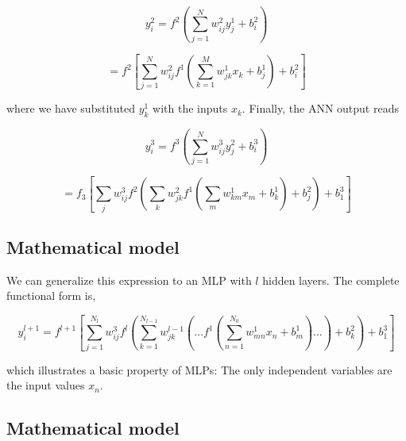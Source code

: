 \documentclass[11pt]{article}
\begin{document}
    \hypertarget{_auto2}{}

\[
\begin{equation}
 y_i^2 = f^2\left(\sum_{j=1}^N w_{ij}^2 y_j^1 + b_i^2\right) 
\label{_auto2} \tag{5}
\end{equation}
\]

    \hypertarget{outputLayer2}{}

\[
\begin{equation} 
 = f^2\left[\sum_{j=1}^N w_{ij}^2f^1\left(\sum_{k=1}^M w_{jk}^1 x_k + b_j^1\right) + b_i^2\right]
\label{outputLayer2} \tag{6}
\end{equation}
\]

    where we have substituted \(y_k^1\) with the inputs \(x_k\). Finally,
the ANN output reads

    \hypertarget{_auto3}{}

\[
\begin{equation}
 y_i^3 = f^3\left(\sum_{j=1}^N w_{ij}^3 y_j^2 + b_i^3\right) 
\label{_auto3} \tag{7}
\end{equation}
\]

    \hypertarget{_auto4}{}

\[
\begin{equation} 
 = f_3\left[\sum_{j} w_{ij}^3 f^2\left(\sum_{k} w_{jk}^2 f^1\left(\sum_{m} w_{km}^1 x_m + b_k^1\right) + b_j^2\right)
  + b_1^3\right]
\label{_auto4} \tag{8}
\end{equation}
\]

    \hypertarget{mathematical-model}{%
\subsection{Mathematical model}\label{mathematical-model}}

We can generalize this expression to an MLP with \(l\) hidden layers.
The complete functional form is,

    \hypertarget{completeNN}{}

\[
\begin{equation}
y^{l+1}_i = f^{l+1}\left[\!\sum_{j=1}^{N_l} w_{ij}^3 f^l\left(\sum_{k=1}^{N_{l-1}}w_{jk}^{l-1}\left(\dots f^1\left(\sum_{n=1}^{N_0} w_{mn}^1 x_n+ b_m^1\right)\dots\right)+b_k^2\right)+b_1^3\right] 
\label{completeNN} \tag{9}
\end{equation}
\]

    which illustrates a basic property of MLPs: The only independent
variables are the input values \(x_n\).

\hypertarget{mathematical-model}{%
\subsection{Mathematical model}\label{mathematical-model}}
\end{document}
